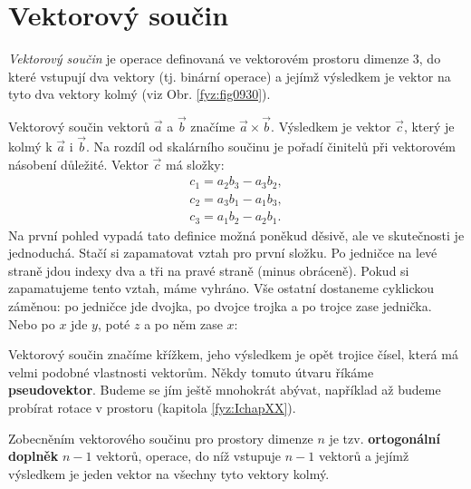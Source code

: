   \section{Vektorový součin}\label{fyz:IchapXIsecVII} 
    \emph{Vektorový součin} je operace definovaná ve vektorovém prostoru dimenze 3, do které
    vstupují dva vektory (tj. binární operace) a jejímž výsledkem je vektor na tyto dva vektory
    kolmý (viz Obr. \ref{fyz:fig0930}).


    Vektorový součin vektorů \(\vec{a}\) a \(\vec{b}\) značíme \(\vec{a}\times\vec{b}\). Výsledkem
    je vektor \(\vec{c}\), který je kolmý k \(\vec{a}\) i \(\vec{b}\). Na rozdíl od skalárního
    součinu je pořadí činitelů při vektorovém násobení důležité. Vektor \(\vec{c}\) má složky: 
    \begin{subequations}\label{fyz:eq752}
      \begin{align}
        c_1 =a_2b_3−a_3b_2,    \label{fyz:eq752a}  \\
        c_2 =a_3b_1−a_1b_3,    \label{fyz:eq752b}  \\
        c_3 =a_1b_2−a_2b_1.    \label{fyz:eq752c}
      \end{align}
    \end{subequations}
    Na první pohled vypadá tato definice možná poněkud děsivě, ale ve skutečnosti je jednoduchá.
    Stačí si zapamatovat vztah pro první složku. Po jedničce na levé straně jdou indexy dva a tři na
    pravé straně (minus obráceně). Pokud si zapamatujeme tento vztah, máme vyhráno. Vše ostatní
    dostaneme cyklickou záměnou: po jedničce jde dvojka, po dvojce trojka a po trojce zase jednička.
    Nebo po \(x\) jde \(y\), poté \(z\) a po něm zase \(x\): 


    Vektorový součin značíme křížkem, jeho výsledkem je opět trojice čísel, která má velmi podobné
    vlastnosti vektorům. Někdy tomuto útvaru říkáme \textbf{pseudovektor}. Budeme se jím ještě
    mnohokrát abývat, například až budeme probírat rotace v prostoru (kapitola \ref{fyz:IchapXX}).

    Zobecněním vektorového součinu pro prostory dimenze \(n\) je tzv. \textbf{ortogonální doplněk}
    \(n-1\) vektorů, operace, do níž vstupuje \(n − 1\) vektorů a jejímž výsledkem je jeden vektor
    na všechny tyto vektory kolmý.

